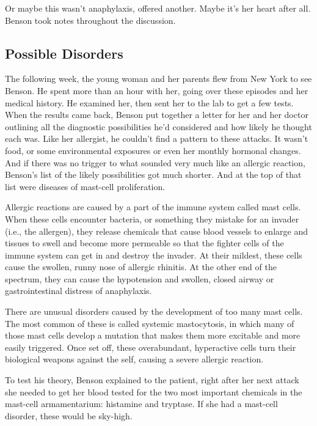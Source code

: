 Or maybe this wasn't anaphylaxis, offered another. Maybe it's her heart
after all. Benson took notes throughout the discussion.

\hypertarget{possible-disorders}{%
\subsection{\texorpdfstring{\textbf{Possible
Disorders}}{Possible Disorders}}\label{possible-disorders}}

The following week, the young woman and her parents flew from New York
to see Benson. He spent more than an hour with her, going over these
episodes and her medical history. He examined her, then sent her to the
lab to get a few tests. When the results came back, Benson put together
a letter for her and her doctor outlining all the diagnostic
possibilities he'd considered and how likely he thought each was. Like
her allergist, he couldn't find a pattern to these attacks. It wasn't
food, or some environmental exposures or even her monthly hormonal
changes. And if there was no trigger to what sounded very much like an
allergic reaction, Benson's list of the likely possibilities got much
shorter. And at the top of that list were diseases of mast-cell
proliferation.

Allergic reactions are caused by a part of the immune system called mast
cells. When these cells encounter bacteria, or something they mistake
for an invader (i.e., the allergen), they release chemicals that cause
blood vessels to enlarge and tissues to swell and become more permeable
so that the fighter cells of the immune system can get in and destroy
the invader. At their mildest, these cells cause the swollen, runny nose
of allergic rhinitis. At the other end of the spectrum, they can cause
the hypotension and swollen, closed airway or gastrointestinal distress
of anaphylaxis.

There are unusual disorders caused by the development of too many mast
cells. The most common of these is called systemic mastocytosis, in
which many of those mast cells develop a mutation that makes them more
excitable and more easily triggered. Once set off, these overabundant,
hyperactive cells turn their biological weapons against the self,
causing a severe allergic reaction.

To test his theory, Benson explained to the patient, right after her
next attack she needed to get her blood tested for the two most
important chemicals in the mast-cell armamentarium: histamine and
tryptase. If she had a mast-cell disorder, these would be sky-high.

